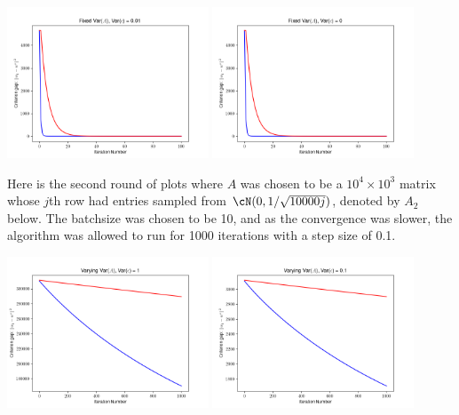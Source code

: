 \begin{homework}[e]
\begin{prf}
\begin{center}
      \bigskip

      \includegraphics[width=0.45\textwidth]{figures/graph3.png}
      \includegraphics[width=0.45\textwidth]{figures/graph4.png}
    \end{center}
    Here is the second round of plots where $A$ was chosen to be a $10^4\times 10^3$ matrix whose $j$th row had entries sampled from $\cN(0,1/\sqrt{10000j})$, denoted by $A_2$ below. The batchsize was chosen to be 10, and as the convergence was slower, the algorithm was allowed to run for 1000 iterations with a step size of 0.1.
    \begin{center}
      \centering
      \includegraphics[width=0.45\textwidth]{figures/graph5.png}
      \includegraphics[width=0.45\textwidth]{figures/graph6.png}


\end{center}
\end{prf}
\end{homework}
